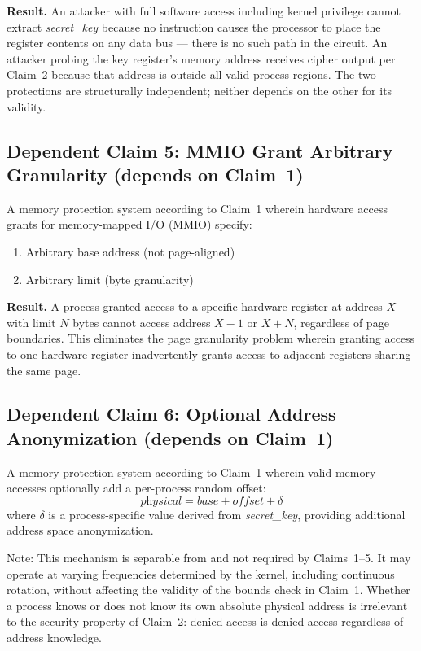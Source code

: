 \documentclass[12pt,letterpaper]{article}
\begin{document}
\textbf{Result.}
An attacker with full software access including kernel privilege cannot extract
\textit{secret\_key} because no instruction causes the processor to place
the register contents on any data bus --- there is no such path in the
circuit.
An attacker probing the key register's memory address receives cipher output
per Claim~2 because that address is outside all valid process regions.
The two protections are structurally independent; neither depends on the
other for its validity.

\medskip

\subsection*{Dependent Claim 5: MMIO Grant Arbitrary Granularity
  (depends on Claim~1)}

A memory protection system according to Claim~1 wherein hardware access grants
for memory-mapped I/O (MMIO) specify:

\begin{enumerate}[label=(\alph*),noitemsep]
  \item Arbitrary base address (not page-aligned)
  \item Arbitrary limit (byte granularity)
\end{enumerate}

\textbf{Result.}
A process granted access to a specific hardware register at address $X$ with
limit $N$ bytes cannot access address $X-1$ or $X+N$, regardless of page
boundaries.
This eliminates the page granularity problem wherein granting access to one
hardware register inadvertently grants access to adjacent registers sharing
the same page.

\medskip

\subsection*{Dependent Claim 6: Optional Address Anonymization
  (depends on Claim~1)}

A memory protection system according to Claim~1 wherein valid memory accesses
optionally add a per-process random offset:
\[
  \textit{physical} = \textit{base} + \textit{offset} + \delta
\]
where $\delta$ is a process-specific value derived from \textit{secret\_key},
providing additional address space anonymization.

Note: This mechanism is separable from and not required by Claims~1--5.
It may operate at varying frequencies determined by the kernel, including
continuous rotation, without affecting the validity of the bounds check
in Claim~1.
Whether a process knows or does not know its own absolute physical address
is irrelevant to the security property of Claim~2: denied access is denied
access regardless of address knowledge.
\end{document}
